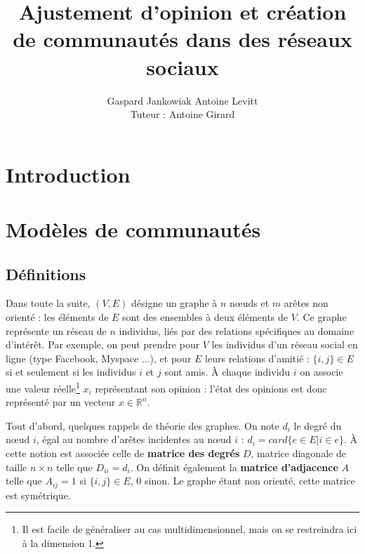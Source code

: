\documentclass[12pt]{article}
\newcommand{\R}{\mathbb{R}}
\begin{document}
\author{Gaspard Jankowiak \quad Antoine Levitt\\ Tuteur : Antoine Girard}
\title{Ajustement d'opinion et création de communautés dans des réseaux sociaux}
\maketitle
{}
\newpage
\tableofcontents
\newpage

\section{Introduction}

\section{Modèles de communautés}
\subsection{Définitions}
Dans toute la suite, $(V, E)$ désigne un graphe à $n$ n\oe uds et $m$
arêtes non orienté : les éléments de $E$ sont des ensembles à deux
éléments de $V$. Ce graphe représente un réseau de $n$ individus, liés
par des relations spécifiques au domaine d'intérêt. Par exemple, on
peut prendre pour $V$ les individus d'un réseau social en ligne (type
Facebook, Myspace ...), et pour $E$ leurs relations d'amitié : $\{i,
j\} \in E$ si et seulement si les individus $i$ et $j$ sont amis. À
chaque individu $i$ on associe une valeur réelle\footnote{Il est facile
de généraliser au cas multidimensionnel, mais on se restreindra ici à la
dimension 1.} $x_i$ représentant son opinion : l'état des opinions est
donc représenté par un vecteur $x \in \R^n$.

Tout d'abord, quelques rappels de théorie des graphes. On note $d_i$
le degré du n\oe ud $i$, égal au nombre d'arêtes incidentes au n\oe ud
$i$ : $d_i = card \{e \in E | i \in e\}$. À cette notion est
associée celle de {\bf matrice des degrés} $D$, matrice diagonale
de taille $n \times n$ telle que $D_{i i} = d_i$. On définit
également la {\bf matrice d'adjacence} $A$ telle que $A_{i j} = 1$
si $\{i, j\} \in E$, $0$ sinon. Le graphe étant non orienté, cette
matrice est symétrique.
\end{document}

